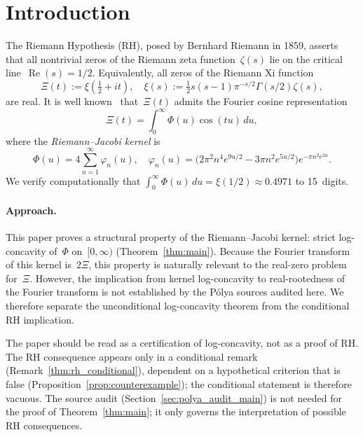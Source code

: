 \documentclass[11pt]{article}
\theoremstyle{definition}
\theoremstyle{remark}
\begin{document}
\section{Introduction}
\label{sec:intro}

The Riemann Hypothesis (RH), posed by Bernhard Riemann in 1859, asserts that
all nontrivial zeros of the Riemann zeta function~$\zeta(s)$ lie on the
critical line~$\operatorname{Re}(s) = 1/2$.
Equivalently, all zeros of the Riemann Xi function
\begin{equation}\label{eq:xi}
\Xi(t) := \xi\!\left(\tfrac{1}{2} + it\right), \quad
\xi(s) := \tfrac{1}{2}s(s-1)\pi^{-s/2}\Gamma(s/2)\zeta(s),
\end{equation}
are real.
It is well known~\cite{titchmarsh1986} that~$\Xi(t)$ admits the Fourier cosine
representation
\begin{equation}\label{eq:fourier}
\Xi(t) = \int_0^\infty \Phi(u)\cos(tu)\,du,
\end{equation}
where the \emph{Riemann--Jacobi kernel} is
\begin{equation}\label{eq:phi}
\Phi(u) = 4\sum_{n=1}^{\infty}\varphi_n(u), \quad
\varphi_n(u) = \bigl(2\pi^2 n^4 e^{9u/2} - 3\pi n^2 e^{5u/2}\bigr)e^{-\pi n^2 e^{2u}}.
\end{equation}
We verify computationally that
$\int_0^\infty \Phi(u)\,du = \xi(1/2) \approx 0.4971$ to 15~digits.

\paragraph{Approach.}
This paper proves a structural property of the Riemann--Jacobi kernel:
strict log-concavity of~$\Phi$ on~$[0,\infty)$ (Theorem~\ref{thm:main}).
Because the Fourier transform of this kernel is~$2\Xi$, this property is
naturally relevant to the real-zero problem for~$\Xi$.
However, the implication from kernel log-concavity to real-rootedness of the
Fourier transform is not established by the P\'{o}lya sources audited here.
We therefore separate the unconditional log-concavity theorem from the conditional
RH implication.

The paper should be read as a certification of log-concavity, not as a proof of RH.
The RH consequence appears only in a conditional remark
(Remark~\ref{thm:rh_conditional}), dependent on a hypothetical criterion that
is false (Proposition~\ref{prop:counterexample}); the conditional statement is
therefore vacuous.
The source audit (Section~\ref{sec:polya_audit_main}) is not needed for the proof
of Theorem~\ref{thm:main}; it only governs the interpretation of possible RH
consequences.
\end{document}
